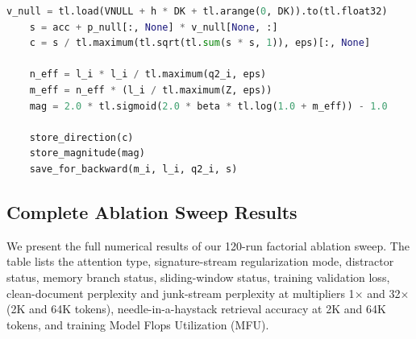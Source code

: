 \documentclass{article} %
\begin{document}
\begin{lstlisting}[language=Python, caption={Core Triton streaming forward pass. The full kernel includes pointer arithmetic, launch metadata, and backward kernels.}, label={lst:polar_triton}]
    v_null = tl.load(VNULL + h * DK + tl.arange(0, DK)).to(tl.float32)
    s = acc + p_null[:, None] * v_null[None, :]
    c = s / tl.maximum(tl.sqrt(tl.sum(s * s, 1)), eps)[:, None]

    n_eff = l_i * l_i / tl.maximum(q2_i, eps)
    m_eff = n_eff * (l_i / tl.maximum(Z, eps))
    mag = 2.0 * tl.sigmoid(2.0 * beta * tl.log(1.0 + m_eff)) - 1.0

    store_direction(c)
    store_magnitude(mag)
    save_for_backward(m_i, l_i, q2_i, s)
\end{lstlisting}
\begin{landscape}
\section{Complete Ablation Sweep Results}
We present the full numerical results of our 120-run factorial ablation sweep. The table lists the attention type, signature-stream regularization mode, distractor status, memory branch status, sliding-window status, training validation loss, clean-document perplexity and junk-stream perplexity at multipliers 1$\times$ and 32$\times$ (2K and 64K tokens), needle-in-a-haystack retrieval accuracy at 2K and 64K tokens, and training Model Flops Utilization (MFU).


\end{landscape}
\end{document}
